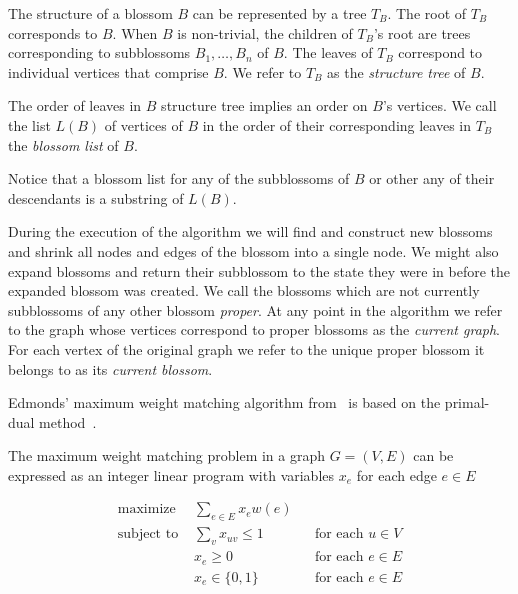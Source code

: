 \begin{defn}
    The structure of a blossom $B$ can be represented by a tree $T_B$. The root of $T_B$ corresponds to $B$. When $B$ is non-trivial, the children of $T_B$'s root are trees corresponding to subblossoms $B_1, \dots, B_n$ of $B$. The leaves of $T_B$ correspond to individual vertices that comprise $B$. We refer to $T_B$ as the \emph{structure tree} of $B$.
\end{defn}

\begin{defn}
    The order of leaves in $B$ structure tree implies an order on $B$'s vertices. We call the list $L(B)$ of vertices of $B$ in the order of their corresponding leaves in $T_B$ the \emph{blossom list} of $B$.
\end{defn}

Notice that a blossom list for any of the subblossoms of $B$ or other any of their descendants is a substring of $L(B)$.

During the execution of the algorithm we will find and construct new blossoms and shrink all nodes and edges of the blossom into a single node. We might also expand blossoms and return their subblossom to the state they were in before the expanded blossom was created. We call the blossoms which are not currently subblossoms of any other blossom \emph{proper}. At any point in the algorithm we refer to the graph whose vertices correspond to proper blossoms as the \emph{current graph}. For each vertex of the original graph we refer to the unique proper blossom it belongs to  as its \emph{current blossom}.

Edmonds' maximum weight matching algorithm from~\cite{edmonds1965maximum} is based on the primal-dual method~\cite{lawler2001combinatorial}.

The maximum weight matching problem in a graph $G=(V,E)$ can be expressed as an integer linear program with variables $x_e$ for each edge $e \in E$

\begin{align*}
\text{maximize }   & \sum_{e \in E} x_e w(e) \\
\text{subject to } & \sum_v x_{uv} \leq 1 &&\text{for each $u \in V$} \\
                   & x_e \geq 0           &&\text{for each $e \in E$} \\
                   & x_e \in\{0, 1\}      &&\text{for each $e \in E$}
\end{align*}

